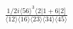 \documentclass[varwidth, border=5pt]{standalone}
\begin{document}
\begin{my}
$\begin{gathered}
\scriptscriptstyle\frac{1/2i\langle56\rangle^3\langle2|1+6|2]}{\langle12\rangle\langle16\rangle\langle23\rangle\langle34\rangle\langle45\rangle}
\end{gathered}$
\end{my}
\end{document}
